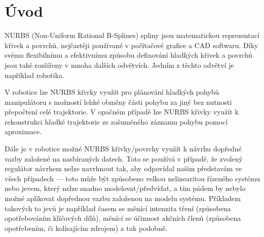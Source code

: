 \section{Úvod}
NURBS (Non-Uniform Rational B-Splines) spliny jsou matematickou reprezentací křivek a povrchů, nejčastěji používané v počítačové grafice a CAD softwaru. Díky svému flexibilnímu a efektivnímu způsobu definování hladkých křivek a povrchů jsou také rozšířeny v mnoha dalších odvětvích. Jedním z těchto odvětví je například robotika.
\par
V robotice lze NURBS křivky využít pro plánování hladkých pohybů manipulátoru s možností lehké obměny části pohybu za jiný bez nutnosti přepočtení celé trajektorie. V opačném případě lze NURBS křivky využít k rekonstrukci hladké trajektorie ze zašuměného záznamu pohybu pomocí aproximace.
\par
Dále je v robotice možné NURBS křivky/povrchy využít k návrhu dopředné vazby založené na nasbíraných datech. Toto se používá v případě, že zvolený regulátor návrhem nelze navrhnout tak, aby odpovídal našim představám ve všech případech --- toto může být způsobeno velkou nelinearitou řízeného systému nebo jevem, který nelze snadno modelovat/předvídat, a tím pádem by nebylo možné aplikovat dopřednou vazbu založenou na modelu systému. Příkladem takových to jevů je například časem se měnící intenzita tření (způsobena opotřebováním klíčových dílů), měnící se účinnost akčních členů (způsobena opotřebením, či kolísajícím zdrojem) a tak podobně.